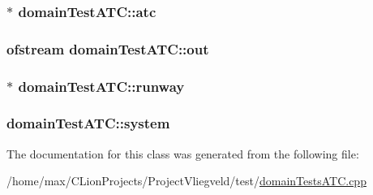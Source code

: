 \subsubsection[{\texorpdfstring{atc}{atc}}]{$\ast$ domain\+Test\+A\+T\+C\+::atc\hspace{0.3cm}{\ttfamily [protected]}}\hypertarget{classdomainTestATC_a36d12fcd41f87e8d7bc1af309a9484d5}{}\label{classdomainTestATC_a36d12fcd41f87e8d7bc1af309a9484d5}
\subsubsection[{\texorpdfstring{out}{out}}]{\setlength{\rightskip}{0pt plus 5cm}ofstream domain\+Test\+A\+T\+C\+::out\hspace{0.3cm}{\ttfamily [protected]}}\hypertarget{classdomainTestATC_ab5da7bf2ad4ca4231a2eb91664a11f5b}{}\label{classdomainTestATC_ab5da7bf2ad4ca4231a2eb91664a11f5b}
\subsubsection[{\texorpdfstring{runway}{runway}}]{$\ast$ domain\+Test\+A\+T\+C\+::runway\hspace{0.3cm}{\ttfamily [protected]}}\hypertarget{classdomainTestATC_a02691fdbeeca3a709416c0dfe0448051}{}\label{classdomainTestATC_a02691fdbeeca3a709416c0dfe0448051}
\subsubsection[{\texorpdfstring{system}{system}}]{ domain\+Test\+A\+T\+C\+::system\hspace{0.3cm}{\ttfamily [protected]}}\hypertarget{classdomainTestATC_a1cb61e4379ab7424f536bcdb4ec339cc}{}\label{classdomainTestATC_a1cb61e4379ab7424f536bcdb4ec339cc}


The documentation for this class was generated from the following file\+:\begin{DoxyCompactItemize}
\item 
/home/max/\+C\+Lion\+Projects/\+Project\+Vliegveld/test/\hyperlink{domainTestsATC_8cpp}{domain\+Tests\+A\+T\+C.\+cpp}\end{DoxyCompactItemize}
